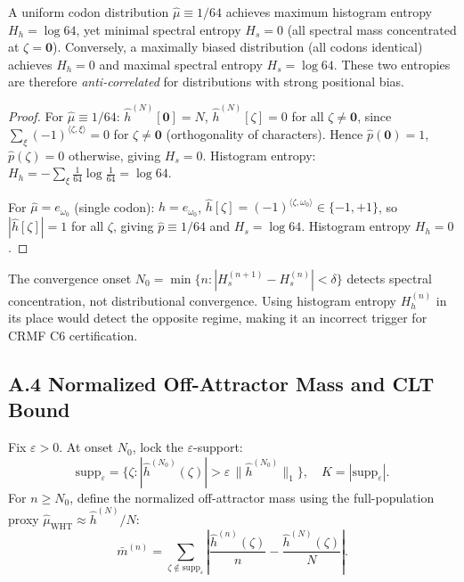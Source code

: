 \documentclass[11pt]{article}
\begin{document}
\begin{proposition}\label{prop:entropy}
A uniform codon distribution $\hat{\mu} \equiv 1/64$ achieves maximum
histogram entropy $H_h = \log 64$, yet minimal spectral entropy
$H_s = 0$ (all spectral mass concentrated at $\zeta = \bm{0}$).
Conversely, a maximally biased distribution (all codons identical) achieves
$H_h = 0$ and maximal spectral entropy $H_s = \log 64$.  These two entropies
are therefore \emph{anti-correlated} for distributions with strong positional bias.
\end{proposition}

\begin{proof}
For $\hat{\mu} \equiv 1/64$: $\hat{h}^{(N)}[\bm{0}] = N$,
$\hat{h}^{(N)}[\zeta] = 0$ for all $\zeta \ne \bm{0}$, since
$\sum_\xi (-1)^{\langle\zeta,\xi\rangle} = 0$ for $\zeta \ne \bm{0}$
(orthogonality of characters).  Hence $\hat{p}(\bm{0}) = 1$,
$\hat{p}(\zeta)=0$ otherwise, giving $H_s = 0$.
Histogram entropy: $H_h = -\sum_\xi \frac{1}{64}\log\frac{1}{64} = \log 64$.

For $\hat{\mu} = e_{\omega_0}$ (single codon): $h = e_{\omega_0}$,
$\hat{h}[\zeta] = (-1)^{\langle\zeta,\omega_0\rangle} \in \{-1,+1\}$,
so $|\hat{h}[\zeta]| = 1$ for all $\zeta$, giving $\hat{p} \equiv 1/64$
and $H_s = \log 64$.  Histogram entropy $H_h = 0$.
\end{proof}

\begin{corollary}
The convergence onset $N_0 = \min\{n : |H_s^{(n+1)} - H_s^{(n)}| < \delta\}$
detects spectral concentration, not distributional convergence.
Using histogram entropy $H_h^{(n)}$ in its place would detect the opposite
regime, making it an incorrect trigger for CRMF C6 certification.
\end{corollary}

\subsection*{A.4 \quad Normalized Off-Attractor Mass and CLT Bound}

\begin{definition}\label{def:supp}
Fix $\varepsilon > 0$.  At onset $N_0$, lock the $\varepsilon$-support:
\[
  \mathrm{supp}_\varepsilon
  = \bigl\{\zeta : |\hat{h}^{(N_0)}(\zeta)| > \varepsilon\,\|\hat{h}^{(N_0)}\|_1\bigr\},
  \quad K = |\mathrm{supp}_\varepsilon|.
\]
For $n \ge N_0$, define the normalized off-attractor mass using the
full-population proxy $\hat{\mu}_{\mathrm{WHT}} \approx \hat{h}^{(N)}/N$:
\[
  \bar{m}^{(n)}
  = \sum_{\zeta \notin \mathrm{supp}_\varepsilon}
    \left| \frac{\hat{h}^{(n)}(\zeta)}{n} - \frac{\hat{h}^{(N)}(\zeta)}{N} \right|.
\]
\end{definition}
\end{document}
